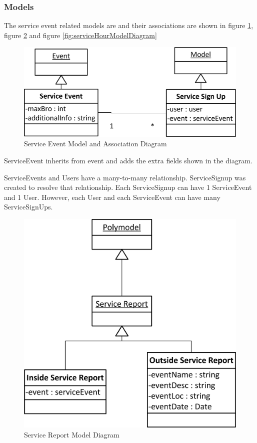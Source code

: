 \documentclass{article}
\begin{document}
\subsubsection{Models}

The service event related models are and their associations are shown in figure \ref{fig:serviceEventModelDiagram}, figure \ref{fig:serviceReportModelDiagram} and figure \ref{fig:serviceHourModelDiagram}

\FloatBarrier
\begin{figure}[h!]
\centering
\includegraphics[scale=.65]{img/modelDiagrams/serviceEventModel}
\caption{Service Event Model and Association Diagram}
\label{fig:serviceEventModelDiagram}
\end{figure}
\FloatBarrier

ServiceEvent inherits from event and adds the extra fields shown in the diagram.

ServiceEvents and Users have a many-to-many relationship. ServiceSignup was created to resolve that relationship. Each ServiceSignup can have 1 ServiceEvent and 1 User. However, each User and each ServiceEvent can have many ServiceSignUps.

\FloatBarrier
\begin{figure}[h!]
\centering
\includegraphics[scale=.65]{img/modelDiagrams/serviceReportModel}
\caption{Service Report Model Diagram}
\label{fig:serviceReportModelDiagram}
\end{figure}
\FloatBarrier
\end{document}
